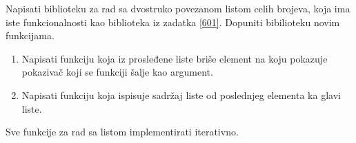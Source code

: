 \begin{Exercise}[label=603]
Napisati biblioteku za rad sa dvostruko povezanom listom celih brojeva, koja ima iste funkcionalnosti kao biblioteka iz zadatka \ref{601}. 
Dopuniti bibilioteku novim funkcijama.
\begin{enumerate}
 \item Napisati funkciju koja iz prosleđene liste briše element na koju pokazuje pokazivač koji se funkciji šalje kao argument.
 \item Napisati funkciju koja ispisuje sadržaj liste od poslednjeg elementa ka glavi liste.
\end{enumerate}

Sve funkcije za rad sa listom implementirati iterativno.
\end{Exercise}
\begin{Answer}[ref=603]
\end{Answer}

